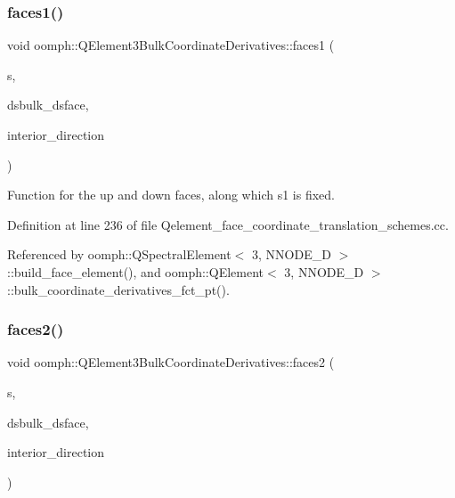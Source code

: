 \subsubsection{\texorpdfstring{faces1()}{faces1()}}
{\footnotesize\ttfamily void oomph\+::\+Q\+Element3\+Bulk\+Coordinate\+Derivatives\+::faces1 (\begin{DoxyParamCaption}\item[{const \hyperlink{classoomph_1_1Vector}{Vector}$<$ double $>$ \&}]{s,  }\item[{\hyperlink{classoomph_1_1DenseMatrix}{Dense\+Matrix}$<$ double $>$ \&}]{dsbulk\+\_\+dsface,  }\item[{unsigned \&}]{interior\+\_\+direction }\end{DoxyParamCaption})}



Function for the up and down faces, along which s1 is fixed. 



Definition at line 236 of file Qelement\+\_\+face\+\_\+coordinate\+\_\+translation\+\_\+schemes.\+cc.



Referenced by oomph\+::\+Q\+Spectral\+Element$<$ 3, N\+N\+O\+D\+E\+\_\+D $>$\+::build\+\_\+face\+\_\+element(), and oomph\+::\+Q\+Element$<$ 3, N\+N\+O\+D\+E\+\_\+D $>$\+::bulk\+\_\+coordinate\+\_\+derivatives\+\_\+fct\+\_\+pt().

\mbox{\label{namespaceoomph_1_1QElement3BulkCoordinateDerivatives_a0026179a7406cf1f5cf254ad2b887172}} 
\subsubsection{\texorpdfstring{faces2()}{faces2()}}
{\footnotesize\ttfamily void oomph\+::\+Q\+Element3\+Bulk\+Coordinate\+Derivatives\+::faces2 (\begin{DoxyParamCaption}\item[{const \hyperlink{classoomph_1_1Vector}{Vector}$<$ double $>$ \&}]{s,  }\item[{\hyperlink{classoomph_1_1DenseMatrix}{Dense\+Matrix}$<$ double $>$ \&}]{dsbulk\+\_\+dsface,  }\item[{unsigned \&}]{interior\+\_\+direction }\end{DoxyParamCaption})}



